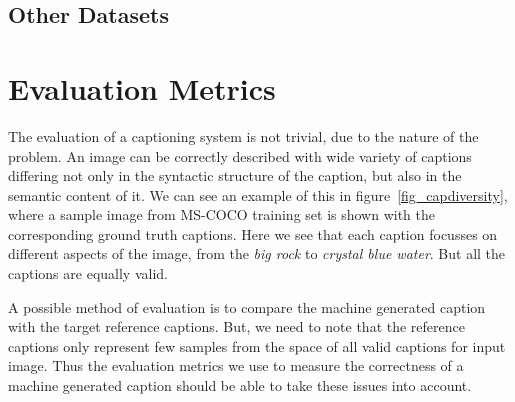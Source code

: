 \subsection{Other Datasets}
\section{Evaluation Metrics}
The evaluation of a captioning system is not trivial, due to the
 nature of the problem.
An image can be correctly described with wide variety of captions differing not
only in the syntactic structure of the caption, but also in the semantic content
of it.
We can see an example of this in figure~\ref{fig_capdiversity}, where a sample
image from MS-COCO training set is shown with the corresponding ground truth
captions.
Here we see that each caption focusses on different aspects of the image, from
the \emph{big rock} to \emph{crystal blue water}.
But all the captions are equally valid.

A possible method of evaluation is to compare the machine generated
caption with the target reference captions.
But, we need to note that the reference captions only represent few samples from
the space of all valid captions for input image.
Thus the evaluation metrics we use to measure the correctness of a machine
generated caption should be able to take these issues into account.

